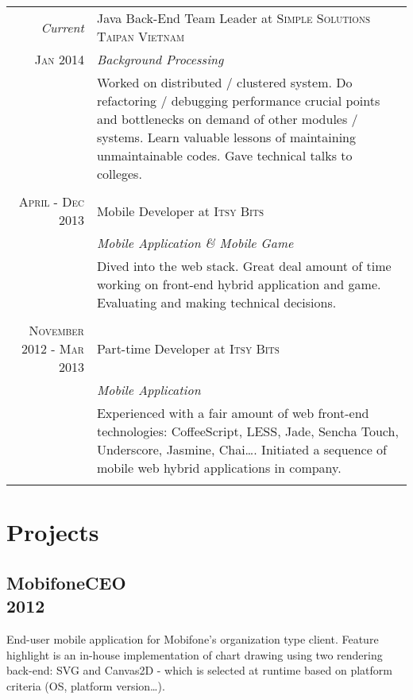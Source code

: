 \documentclass[a4paper,10pt]{article}
\begin{document}
\begin{tabular}{r|p{11cm}}

    \emph{Current} & Java Back-End Team Leader at \textsc{Simple Solutions Taipan Vietnam} \\\textsc{Jan 2014}&\emph{Background Processing}\\&\footnotesize{Worked on distributed / clustered system. Do refactoring / debugging performance crucial points and bottlenecks on demand of other modules / systems. Learn valuable lessons of maintaining unmaintainable codes. Gave technical talks to colleges.}\\\multicolumn{2}{c}{} \\

    \textsc{April - Dec 2013 } & Mobile Developer at \textsc{Itsy Bits} \\&\emph{Mobile Application \& Mobile Game}\\&\footnotesize{Dived into the web stack. Great deal amount of time working on front-end hybrid application and game. Evaluating and making technical decisions.}\\\multicolumn{2}{c}{} \\

    \textsc{November 2012 - Mar 2013} & Part-time Developer at \textsc{Itsy Bits} \\&\emph{Mobile Application}\\&\footnotesize{Experienced with a fair amount of web front-end technologies: CoffeeScript, LESS, Jade, Sencha Touch, Underscore, Jasmine, Chai\ldots. Initiated a sequence of mobile web hybrid applications in company.}\\\multicolumn{2}{c}{} \\

\end{tabular}

\section{Projects}


\subsection*{MobifoneCEO\\\small 2012}

End-user mobile application for Mobifone's organization type client. Feature highlight is an in-house implementation of chart drawing using two rendering back-end: SVG and Canvas2D - which is selected at runtime based on platform criteria (OS, platform version\ldots).
\end{document}
